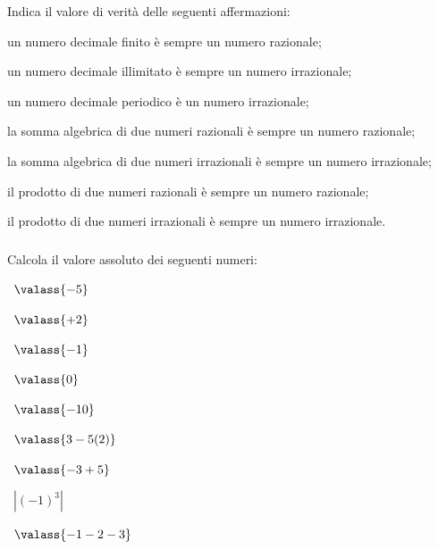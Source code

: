 \begin{esercizio}
\label{ese:1.7}
Indica il valore di verità delle seguenti affermazioni:
\begin{enumeratea}
\item un numero decimale finito è sempre un numero razionale;
\item un numero decimale illimitato è sempre un numero irrazionale;
\item un numero decimale periodico è un numero irrazionale;
\item la somma algebrica di due numeri razionali è sempre un numero 
razionale;
\item la somma algebrica di due numeri irrazionali è sempre un numero 
irrazionale;
\item il prodotto di due numeri razionali è sempre un numero razionale;
\item il prodotto di due numeri irrazionali è sempre un numero irrazionale.
\end{enumeratea}
\end{esercizio}

\subsubsection*{}

\begin{esercizio}
\label{ese:1.8}
 Calcola il valore assoluto dei seguenti numeri:
\begin{multicols}{3}
 \begin{enumeratea}
 \item~$\valass{-5}$
 \item~$\valass{+2}$
 \item~$\valass{-1}$
 \item~$\valass{0}$
 \item~$\valass{-10}$
 \item~$\valass{3-5(2)}$
 \item~$\valass{-3+5}$
 \item~$\left|{(-1)^3}\right|$
 \item~$\valass{-1-2-3}$
 \end{enumeratea}
 \end{multicols}
\end{esercizio}

